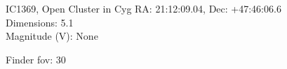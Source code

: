 \begin{block}{IC1369, Open Cluster in Cyg}
    RA: 21:12:09.04, Dec: +47:46:06.6 \\ 
    Dimensions: 5.1 \\ 
    Magnitude (V): None



    Finder fov: 30 

     
\end{block}